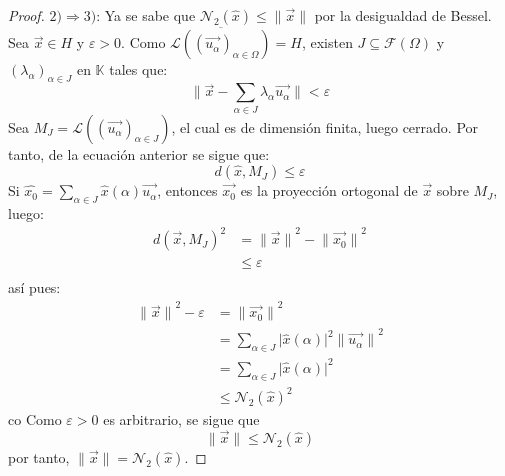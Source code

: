 \documentclass[12pt]{report}
\theoremstyle{largebreak}
\newcommand\abs[1]{\ensuremath{\big|#1\big|}}
\newcommand\norm[1]{\ensuremath{\|#1\|}}
\newcommand{\N}[2]{\ensuremath{\mathcal{N}_{#1}\left(#2\right)}}
\begin{document}
\begin{proof}
        $2)\Rightarrow 3)$: Ya se sabe que $\N{2}{\hat{x}}\leq\norm{\vec{x}}$ por la desigualdad de Bessel.
        Sea $\vec{x}\in H$ y $\varepsilon>0$. Como $\overline{\mathcal{L}\left(\left(\vec{u_\alpha} \right)_{\alpha\in\Omega}\right)}= H$, existen $J\subseteq \mathcal{F}(\Omega)$ y $\left(\lambda_\alpha \right)_{\alpha\in J }$ en $\mathbb{K}$ tales que:
        \begin{equation}
            \norm{\vec{x}-\sum_{\alpha\in J }\lambda_\alpha\vec{u_\alpha}}<\varepsilon
        \end{equation}
        Sea $M_J=\mathcal{L}\left(\left(\vec{u_\alpha} \right)_{ \alpha\in J} \right)$, el cual es de dimensión finita, luego cerrado. Por tanto, de la ecuación anterior se sigue que:
        \begin{equation*}
            d(\hat{x},M_J)\leq\varepsilon
        \end{equation*}
        Si $\hat{x_0}=\sum_{\alpha\in J}\hat{x}(\alpha)\vec{u_\alpha}$, entonces $\vec{x_0}$ es la proyección ortogonal de $\vec{x}$ sobre $M_J$, luego:
        \begin{equation*}
            \begin{split}
                d(\vec{x},M_J)^2&=\norm{\vec{x}}^2-\norm{\vec{x_0}}^2\\
                &\leq\varepsilon\\
            \end{split}
        \end{equation*}
        así pues:
        \begin{equation*}
            \begin{split}
                \norm{\vec{x}}^2-\varepsilon&=\norm{\vec{x_0}}^2 \\
                &=\sum_{\alpha\in J}\abs{\hat{x}(\alpha)}^2\norm{\vec{u_\alpha}}^2\\
                &=\sum_{\alpha\in J}\abs{\hat{x}(\alpha)}^2\\
                &\leq\N{2}{\hat{x}}^2
            \end{split}
        \end{equation*}co
        Como $\varepsilon>0$ es arbitrario, se sigue que
        \begin{equation*}
            \norm{\vec{x}}\leq\N{2}{\hat{x}}
        \end{equation*}
        por tanto, $\norm{\vec{x}}=\N{2}{\hat{x}}$.


\end{proof}
\end{document}

